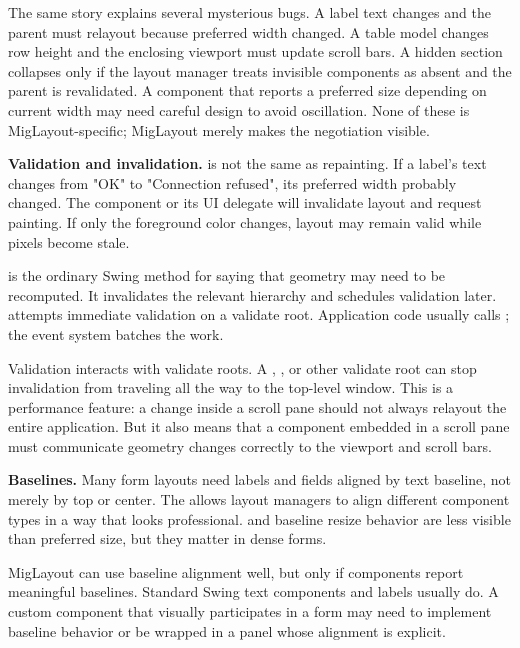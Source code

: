 The same story explains several mysterious bugs. A label text changes and the
parent must relayout because preferred width changed. A table model changes row
height and the enclosing viewport must update scroll bars. A hidden section
collapses only if the layout manager treats invisible components as absent and
the parent is revalidated. A component that reports a preferred size depending
on current width may need careful design to avoid oscillation. None of these is
MigLayout-specific; MigLayout merely makes the negotiation visible.

\textbf{Validation and invalidation.}  is not the same as repainting. If a label's text changes from "OK" to "Connection refused", its preferred width probably changed. The component or its UI delegate will invalidate layout and request painting. If only the foreground color changes, layout may remain valid while pixels become stale.

 is the ordinary Swing method for saying that geometry may need to be recomputed. It invalidates the relevant hierarchy and schedules validation later.  attempts immediate validation on a validate root. Application code usually calls ; the event system batches the work.

Validation interacts with validate roots. A , , or other validate root can stop invalidation from traveling all the way to the top-level window. This is a performance feature: a change inside a scroll pane should not always relayout the entire application. But it also means that a component embedded in a scroll pane must communicate geometry changes correctly to the viewport and scroll bars.

\textbf{Baselines.} Many form layouts need labels and fields aligned by text baseline, not merely by top or center. The  allows layout managers to align different component types in a way that looks professional.  and baseline resize behavior are less visible than preferred size, but they matter in dense forms.

MigLayout can use baseline alignment well, but only if components report meaningful baselines. Standard Swing text components and labels usually do. A custom component that visually participates in a form may need to implement baseline behavior or be wrapped in a panel whose alignment is explicit.

